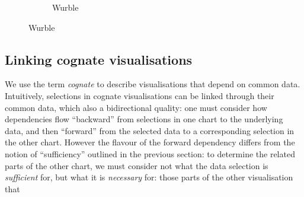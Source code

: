 \begin{figure}[H]
   \small
   \begin{subfigure}{0.32\textwidth}
      {}
   \caption{Wurble}
   \end{subfigure}
\end{figure}

\subsection{Linking cognate visualisations}

We use the term \emph{cognate} to describe visualisations that depend on common data. Intuitively, selections in cognate visualisations can be linked through their common data, which also a bidirectional quality: one must consider how dependencies flow ``backward'' from selections in one chart to the underlying data, and then ``forward'' from the selected data to a corresponding selection in the other chart. However the flavour of the forward dependency differs from the notion of ``sufficiency'' outlined in the previous section: to determine the related parts of the other chart, we must consider not what the data selection is \emph{sufficient} for, but what it is \emph{necessary} for: those parts of the other visualisation that



